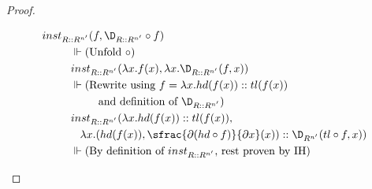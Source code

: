 \begin{proof}
\begin{itemize}
      \begin{align*}
        inst&_{R :: R^{n'}}(f, \D_{R :: R^{n'}} \circ f) \\
        & \;\;\; \Vdash \text{(Unfold $\circ$)} \\
        & \;\;\; inst_{R :: R^{n'}}(\lambda x. f(x), \lambda x. \D_{R :: R^{n'}}( f, x)) \\
        & \;\;\; \Vdash \text{(Rewrite using $f = \lambda x. hd(f(x)) :: tl(f(x))$} \\
        & \;\;\;\;\;\;\;\;\;\;\;\; \text{and definition of $\D_{R :: R^{n'}}$)} \\
        & \;\;\; inst_{R :: R^{n'}}(\lambda x. hd(f(x)) :: tl(f(x)), \\
        & \;\;\;\;\;\;
          \lambda x. (hd(f(x)), \sfrac{\partial{(hd \circ f)}}{\partial{x}}(x)) :: \D_{R^{n'}}(tl \circ f, x)) \\
        & \;\;\; \Vdash \text{(By definition of $inst_{R :: R^{n'}}$, rest proven by IH)}
      \end{align*}
    \end{itemize}
  \end{proof}